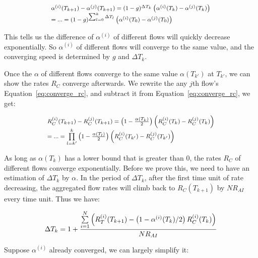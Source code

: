 \begin{equation}
\small
\begin{array}{l}
{\alpha ^{(i)}}({T_{k + 1}}) - {\alpha ^{(j)}}({T_{k + 1}}) = {(1 - g)^{\Delta {T_k}}}\left( {{\alpha ^{(i)}}({T_k}) - {\alpha ^{(j)}}({T_k})} \right)\\
 = ... = {(1 - g)^{\sum\nolimits_{l = 0}^k {\Delta {T_l}} }}\left( {{\alpha ^{(i)}}({T_0}) - {\alpha ^{(j)}}({T_0})} \right)
\end{array}
\end{equation}

This tells us the difference of $\alpha^{(i)}$ of different flows will quickly decrease exponentially. So $\alpha^{(i)}$
of different flows will converge to the same value, and the converging speed is determined by $g$ and
$\Delta T_k$. 

Once the $\alpha$ of different flows converge to the same value $\alpha(T_{k'})$ at $T_{k'}$, we can show 
the rates $R_C$ converge afterwards. We rewrite the any $j$th flow's Equation~\ref{eq:converge_rc}, and subtract it 
from Equation~\ref{eq:converge_rc}, we get:

\begin{equation}
\small
\begin{array}{l}
R_C^{(i)}({T_{k + 1}}) - R_C^{(j)}({T_{k + 1}}) = \left( {1 - \frac{{\alpha ({T_k})}}{2}} \right)\left( {R_C^{(i)}({T_k}) - R_C^{(j)}({T_k})} \right)\\
 = ... = \prod\limits_{l = k'}^k {\left( {1 - \frac{{\alpha ({T_l})}}{2}} \right)} \left( {R_C^{(i)}({T_{k'}}) - R_C^{(j)}({T_{k'}})} \right)
\end{array}
\end{equation}

As long as $\alpha ({T_k})$ has a lower bound that is greater than 0, the rates $R_C$ of different flows 
converge exponentially. Before we prove this, we need to have an estimation of $\Delta T_k$ by $\alpha$.
In the period of $\Delta T_k$, after the first time unit of rate decreasing, the aggregated flow rates
will climb back to $R_C(T_{k+1})$ by $NR_{AI}$ every time unit. Thus we have:

\begin{equation}
\small\Delta {T_k} = 1 + \frac{{\sum\limits_{i = 1}^N {\left( {R_T^{(i)}({T_{k + 1}}) - \left( {1 - {\alpha ^{(i)}}({T_k})/2} \right)R_C^{(i)}({T_k})} \right)} }}{{N{R_{AI}}}}
\end{equation}

Suppose $\alpha^{(i)}$ already converged, we can largely simplify it:

